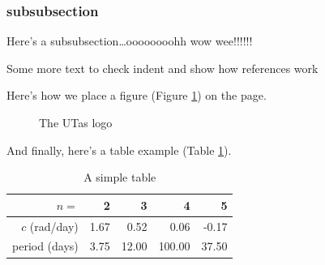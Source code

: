 \subsubsection{subsubsection}
Here's a subsubsection\ldots oooooooohh wow
wee!!!!!!

\newpage
Some more text to check indent and show how references work

Here's how we place a figure (Figure \ref{fig:utas}) on the page.
\begin{figure}[hbtp]
\begin{center}
 \caption{
\label{fig:utas} The UTas logo}
\end{center}
\end{figure}

And finally, here's a table example (Table \ref{tab:taba}).
\begin{table}[hbtp]
\begin{center}
\begin{tabular}{|r|r|r|r|r|}
\hline
$n=$&2&3&4&5\\
\hline
$c$ (rad/day)&1.67&0.52&0.06&-0.17\\
\hline
period (days)&3.75&12.00&100.00&37.50\\
\hline
\end{tabular}
\end{center}
\caption{\label{tab:taba}A simple table}
\end{table}
